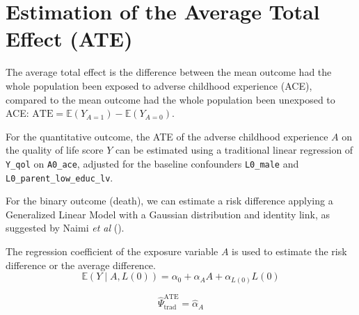 \documentclass[
]{book}
\begin{document}
\section{Estimation of the Average Total Effect (ATE)}\label{estimation-of-the-average-total-effect-ate}

The average total effect is the difference between the mean outcome had the whole population been exposed to adverse childhood experience (ACE), compared to the mean outcome had the whole population been unexposed to ACE:
\(\text{ATE} = \mathbb{E}(Y_{A=1}) - \mathbb{E}(Y_{A=0})\).

For the quantitative outcome, the ATE of the adverse childhood experience \(A\) on the quality of life score \(Y\) can be estimated using a traditional linear regression of \texttt{Y\_qol} on \texttt{A0\_ace}, adjusted for the baseline confounders \texttt{L0\_male} and \texttt{L0\_parent\_low\_educ\_lv}.

For the binary outcome (death), we can estimate a risk difference applying a Generalized Linear Model with a Gaussian distribution and identity link, as suggested by Naimi \emph{et al} ().

The regression coefficient of the exposure variable \(A\) is used to estimate the risk difference or the average difference.
\begin{equation} 
  \mathbb{E}(Y \mid A, L(0)) = \alpha_0 + \alpha_A A + \alpha_{L(0)} L(0) 
  \label{eq:regtotaleffect}
\end{equation}

\[ \hat{\Psi}_{\text{trad}}^{\text{ATE}} = \hat{\alpha}_A\]
\end{document}
